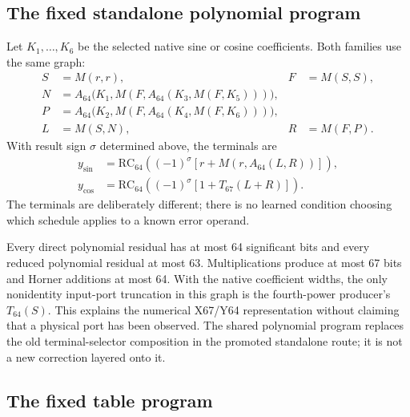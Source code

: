 \documentclass[11pt]{article}
\begin{document}
\subsection{The fixed standalone polynomial program}
\label{sec:polynomial}

Let $K_1,\ldots,K_6$ be the selected native sine or cosine coefficients.
Both families use the same graph:
\[
 \begin{aligned}
 S&=M(r,r),& F&=M(S,S),\\
 N&=A_{64}\bigl(K_1,M(F,A_{64}(K_3,M(F,K_5)))\bigr),\\
 P&=A_{64}\bigl(K_2,M(F,A_{64}(K_4,M(F,K_6)))\bigr),\\
 L&=M(S,N),& R&=M(F,P).
 \end{aligned}
\]
With result sign $\sigma$ determined above, the terminals are
\[
 \begin{aligned}
 y_{\sin}&=\mathrm{RC}_{64}\left((-1)^\sigma
       \left[r+M(r,A_{64}(L,R))\right]\right),\\
 y_{\cos}&=\mathrm{RC}_{64}\left((-1)^\sigma
       \left[1+T_{67}(L+R)\right]\right).
 \end{aligned}
\]
The terminals are deliberately different; there is no learned condition
choosing which schedule applies to a known error operand.

Every direct polynomial residual has at most 64 significant bits and every
reduced polynomial residual at most 63. Multiplications produce at most 67
bits and Horner additions at most 64. With the native coefficient widths,
the only nonidentity input-port truncation in this graph is the fourth-power
producer's $T_{64}(S)$. This explains the numerical X67/Y64 representation
without claiming that a physical port has been observed.
The shared polynomial program replaces the old terminal-selector composition
in the promoted standalone route; it is not a new correction layered onto it.

\subsection{The fixed table program}
\label{sec:table}
\end{document}

